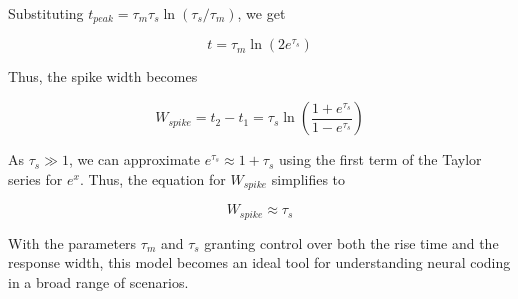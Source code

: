 Substituting $t_{peak} = \tau_m \tau_s \ln(\tau_s/\tau_m)$, we get

\begin{equation}
t = \tau_m \ln\left(2 e^{\tau_s}\right)
\end{equation}

Thus, the spike width becomes

\begin{equation}
W_{spike} = t_2 - t_1 = \tau_s \ln\left(\frac{1 + e^{\tau_s}}{1 - e^{\tau_s}}\right)
\end{equation}

As $\tau_s \gg 1$, we can approximate $e^{\tau_s} \approx 1 + \tau_s$ using the first term of the Taylor series for $e^x$. Thus, the equation for $W_{spike}$ simplifies to

\begin{equation}
W_{spike} \approx \tau_s
\end{equation}


With the parameters $\tau_m$ and $\tau_s$ granting control over both the rise time and the response width, this model becomes an ideal tool for understanding neural coding in a broad range of scenarios.